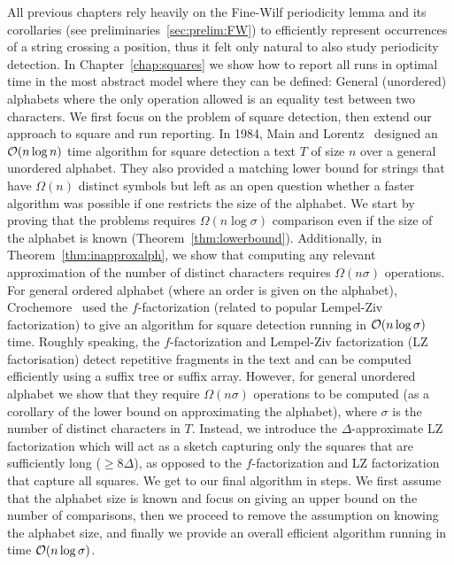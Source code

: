 All previous chapters rely heavily on the Fine-Wilf periodicity lemma and its corollaries (see preliminaries~\ref{sec:prelim:FW}) to efficiently represent occurrences of a string crossing a position, thus it felt only natural to also study periodicity detection. In Chapter~\ref{chap:squares} we show how to report all runs  in optimal time in the most abstract model where they can be defined: General (unordered) alphabets where the only operation allowed is an equality test between two characters. 
We first focus on the problem of square detection, then extend our approach to square and run reporting.
In 1984, Main and Lorentz~\cite{Main1984} designed an $\mathcal{O}(n\log n)$ time algorithm for square detection a text $T$ of size $n$ over a general unordered alphabet. They also provided a matching lower bound for strings that have $\Omega(n)$ distinct symbols but left as an open question whether a faster algorithm was possible if one restricts the size of the alphabet.
We start by proving that the problems requires $\Omega(n \log \sigma)$ comparison even if the size of the alphabet is known (Theorem~\ref{thm:lowerbound}). Additionally, in Theorem~\ref{thm:inapproxalph}, we show that computing any relevant approximation of the number of distinct characters requires $\Omega(n\sigma)$ operations.
For general ordered alphabet (where an order is given on the alphabet), Crochemore~\cite{Crochemore1986} used the $f$-factorization (related to popular Lempel-Ziv factorization) to give an algorithm for square detection running in $\mathcal{O}(n\log \sigma)$ time. Roughly speaking, the $f$-factorization and Lempel-Ziv factorization (LZ factorisation) detect repetitive fragments in the text and can be computed efficiently using a suffix tree or suffix array. However, for general unordered alphabet we show that they require $\Omega(n\sigma)$ operations to be computed (as a corollary of the lower bound on approximating the alphabet), where $\sigma$ is the number of distinct characters in $T$.
Instead, we introduce the $\Delta$-approximate LZ factorization which will act as a sketch capturing only the squares that are sufficiently long ($\geq 8\Delta$), as opposed to the $f$-factorization and LZ factorization that capture all squares.
We get to our final algorithm in steps. We first assume that the alphabet size is known and focus on giving an upper bound on the number of comparisons, then we proceed to remove the assumption on knowing the alphabet size, and finally we provide an overall efficient algorithm running in time $\mathcal{O}(n\log\sigma)$.





